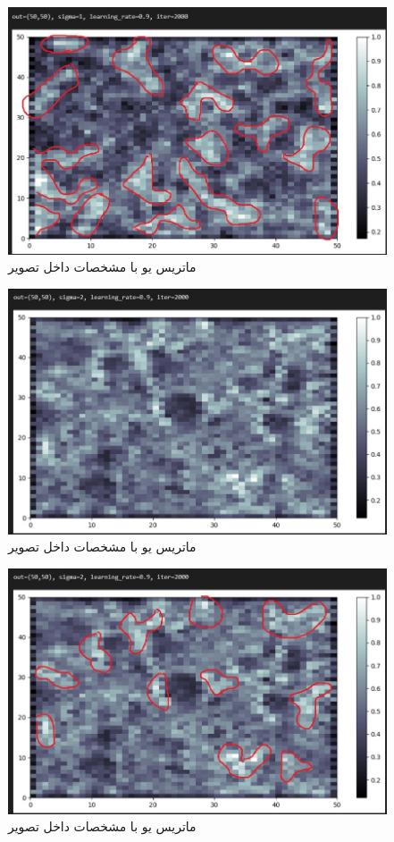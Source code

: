 \documentclass{article}
\begin{document}
\begin{figure}[!h]
    \centering\includegraphics[scale=.65]{./p3-2}
    \caption{ماتریس یو با مشخصات داخل تصویر}\label{fig.32}
\end{figure}


\cleardoublepage

\begin{figure}[!h]
    \centering\includegraphics[scale=.65]{./p3-3}
    \caption{ماتریس یو با مشخصات داخل تصویر}\label{fig.33}
\end{figure}

\begin{figure}[!h]
    \centering\includegraphics[scale=.65]{./p3-4}
    \caption{ماتریس یو با مشخصات داخل تصویر}\label{fig.34}
\end{figure}
\end{document}
